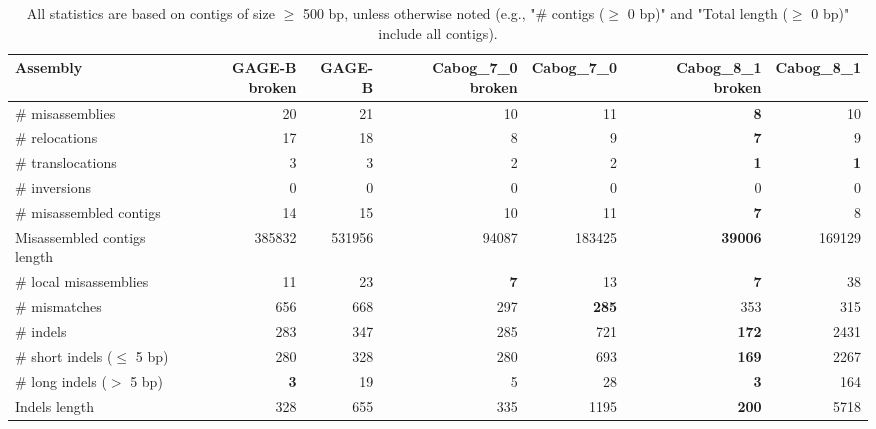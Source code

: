 \documentclass[12pt,a4paper]{article}
\begin{document}
\begin{table}[ht]
\begin{center}
\caption{All statistics are based on contigs of size $\geq$ 500 bp, unless otherwise noted (e.g., "\# contigs ($\geq$ 0 bp)" and "Total length ($\geq$ 0 bp)" include all contigs).}
\begin{tabular}{|l*{6}{|r}|}
\hline
Assembly & GAGE-B broken & GAGE-B & Cabog\_7\_0 broken & Cabog\_7\_0 & Cabog\_8\_1 broken & Cabog\_8\_1 \\ \hline
\# misassemblies & 20 & 21 & 10 & 11 & {\bf 8} & 10 \\ \hline
\hspace{5mm}\# relocations & 17 & 18 & 8 & 9 & {\bf 7} & 9 \\ \hline
\hspace{5mm}\# translocations & 3 & 3 & 2 & 2 & {\bf 1} & {\bf 1} \\ \hline
\hspace{5mm}\# inversions & 0 & 0 & 0 & 0 & 0 & 0 \\ \hline
\# misassembled contigs & 14 & 15 & 10 & 11 & {\bf 7} & 8 \\ \hline
Misassembled contigs length & 385832 & 531956 & 94087 & 183425 & {\bf 39006} & 169129 \\ \hline
\# local misassemblies & 11 & 23 & {\bf 7} & 13 & {\bf 7} & 38 \\ \hline
\# mismatches & 656 & 668 & 297 & {\bf 285} & 353 & 315 \\ \hline
\# indels & 283 & 347 & 285 & 721 & {\bf 172} & 2431 \\ \hline
\hspace{5mm}\# short indels ($\leq$ 5 bp) & 280 & 328 & 280 & 693 & {\bf 169} & 2267 \\ \hline
\hspace{5mm}\# long indels ($>$ 5 bp) & {\bf 3} & 19 & 5 & 28 & {\bf 3} & 164 \\ \hline
Indels length & 328 & 655 & 335 & 1195 & {\bf 200} & 5718 \\ \hline
\end{tabular}
\end{center}
\end{table}
\end{document}
